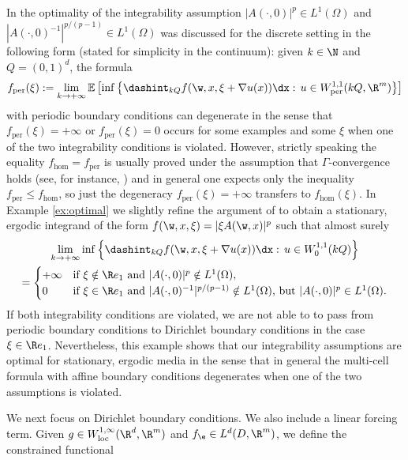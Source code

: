\begin{remark}\label{r.optimal}
In \cite[Rem.\,2.3]{NSS} the optimality of the integrability assumption $|A(\cdot,0)|^p\in L^1(\Omega)$ and $|A(\cdot,0)^{-1}|^{p/(p-1)}\in L^1(\Omega)$ was discussed for the discrete setting in the following form (stated for simplicity in the continuum): given $k\in\N$ and $Q=(0,1)^d$, the formula
\begin{equation*}
f_\mathrm{per}(\xi):=\lim_{k\to +\infty}\mathbb{E}\left[\inf\left\{\dashint_{kQ}f(\w,x,\xi+\nabla u(x))\dx:\,u\in W^{1,1}_\mathrm{per}(kQ,\R^m)\right\}\right]
\end{equation*}
with periodic boundary conditions can degenerate in the sense that $f_\mathrm{per}(\xi)=+\infty$ or $f_\mathrm{per}(\xi)=0$ occurs for some examples and some $\xi$ when one of the two integrability conditions is violated. However, strictly speaking the equality $f_{\hom}=f_\mathrm{per}$ is usually proved under the assumption that $\Gamma$-convergence holds (see, for instance, \cite[\S 4.7]{NSS}) and in general one expects only the inequality $f_\mathrm{per}\leq f_{\hom}$, so just the degeneracy $f_\mathrm{per}(\xi)=+\infty$ transfers to $f_{\hom}(\xi)$. In Example \ref{ex:optimal} we slightly refine the argument of \cite{NSS} to obtain a stationary, ergodic integrand of the form $f(\w,x,\xi)=|\xi A(\w,x)|^p$ such that almost surely
\begin{multline*}
\lim_{k\to +\infty}\inf\left\{\dashint_{kQ}f(\w,x,\xi+\nabla u(x))\dx:\,u\in W^{1,1}_{0}(kQ)\right\}
\\
=
\begin{cases}
+\infty &\mbox{if $\xi\notin\R e_1$ and $|A(\cdot,0)|^p\notin L^1(\Omega)$,}
\\
0 &\mbox{if $\xi\in\R e_1$ and $|A(\cdot,0)^{-1}|^{p/(p-1)}\notin L^1(\Omega)$, but $|A(\cdot,0)|^p\in L^1(\Omega)$.}
\end{cases}
\end{multline*}
If both integrability conditions are violated, we are not able to to pass from periodic boundary conditions to Dirichlet boundary conditions in the case $\xi\in\R e_1$. Nevertheless, this example shows that our integrability assumptions are optimal for stationary, ergodic media in the sense that in general the multi-cell formula with affine boundary conditions degenerates when one of the two assumptions is violated.
\end{remark}
We next focus on Dirichlet boundary conditions. We also include a linear forcing term. Given $g\in W_\mathrm{loc}^{1,\infty}(\R^d,\R^m)$ and $f_{\e}\in L^d(D,\R^m)$, we define the constrained functional
